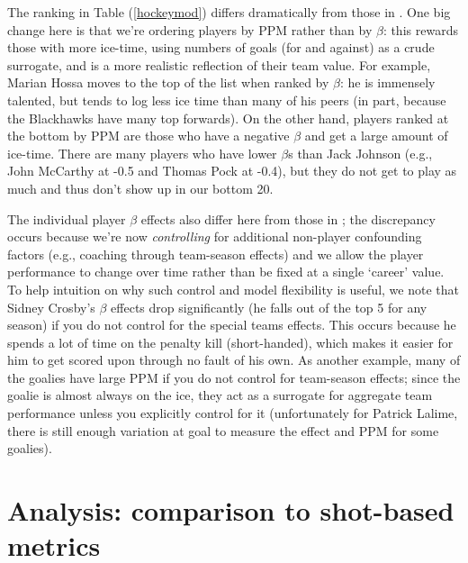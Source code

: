 The ranking in Table (\ref{hockeymod}) differs dramatically from those in
\cite{gramacy:jensen:taddy:2013}.  One big change here is that we're ordering
players by PPM rather than by $\beta$: this rewards those with more ice-time,
using numbers of goals (for and against) as a crude surrogate, and is a more
realistic reflection of their team value.  For example, Marian Hossa moves to
the top of the list when ranked by $\beta$: he is immensely talented, but
tends to log less ice time than many of his peers (in part, because the
Blackhawks have many top forwards).  On the other hand, players ranked at the
bottom by PPM are those who have a negative $\beta$ and get a large amount of
ice-time. There are many players who have lower $\beta$s than Jack Johnson
(e.g., John McCarthy at -0.5 and Thomas Pock at -0.4), but they do not get to
play as much and thus don't show up in our bottom 20.

 The individual player
$\beta$ effects also differ here from those in
\cite{gramacy:jensen:taddy:2013}; the discrepancy occurs because we're now
\textit{controlling} for additional non-player confounding factors (e.g.,
coaching through team-season effects) and we allow the player performance to
change over time rather than be fixed at a single `career' value.   To help
intuition on why such control and model flexibility is useful, we note that
Sidney Crosby's $\beta$ effects drop significantly (he falls out of the top 5
for any season) if you do not control for the special teams effects.  This
occurs because he spends a lot of time on the penalty kill (short-handed),
which makes it easier for him to get scored upon through no fault of his own.
As another example, many of the goalies have large PPM if you do not control
for team-season effects; since the goalie is almost always on the ice, they
act as a surrogate for aggregate team performance unless you explicitly
control for it (unfortunately for Patrick Lalime, there is still enough
variation at goal to measure the effect and PPM for some goalies).

\section{Analysis: comparison to shot-based metrics}
\label{sec:shots}


